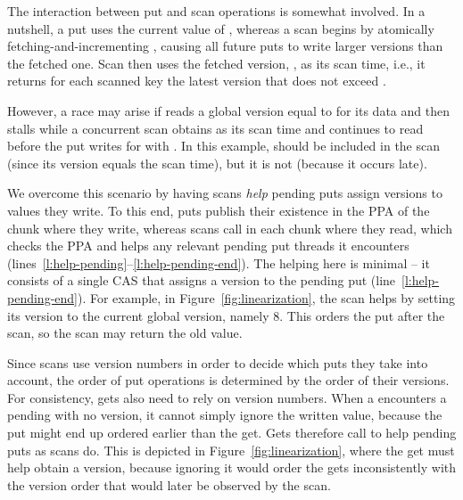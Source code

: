 The interaction between put and scan operations is somewhat involved. In a nutshell, a put uses the current value of , whereas a scan begins by atomically fetching-and-incrementing , causing all future puts to write larger versions than the fetched one. Scan then uses the fetched version, , as its scan time, i.e., it returns for each scanned key the latest version that does not exceed .

However,  a race may arise if
   reads a global version equal to  for its data and then stalls while a concurrent scan obtains  as its scan time and continues to read  before the put writes  for  with  . In this example,  should be included in the scan (since its version equals the scan time), but it is not (because it occurs late).

We overcome this scenario by having scans \emph{help} pending puts assign versions to values they write. To this end, puts publish their existence in the PPA of the chunk where they write, whereas scans call  in each chunk where they read, which 
checks the PPA  and helps any relevant pending put threads it encounters (lines~\ref{l:help-pending}--\ref{l:help-pending-end}).
The helping here is minimal -- it consists of a single CAS that assigns a version to the pending put (line~\ref{l:help-pending-end}).
For example, in Figure~\ref{fig:linearization}, the scan helps  by setting its version to the current global version, namely $8$.
This orders the put after the scan, so the scan may return the old value.


Since scans use version numbers in order to decide which puts they take into account, the  order of put operations is determined by the order of their versions.
For consistency, gets also need to rely on version numbers.
When a   encounters a pending   with no version, it cannot simply ignore the written value, because the put might end up ordered earlier than the get.
Gets therefore call     to help pending puts as scans do.
This is depicted in Figure~\ref{fig:linearization}, where the get must help  obtain a version, because ignoring it
would order the gets inconsistently with the version order that would later be
observed by the scan.


